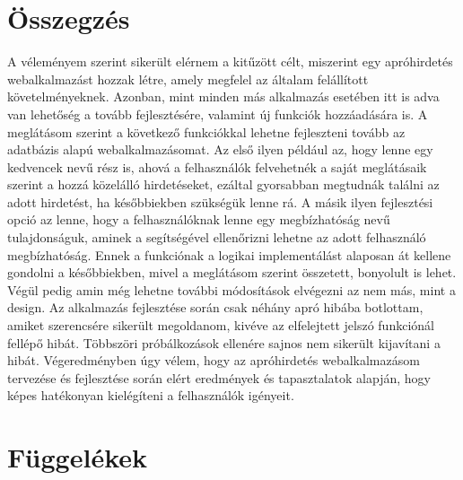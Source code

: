 \documentclass[]{thesis-ekf}
\theoremstyle{definition}
\theoremstyle{remark}
\begin{document}
	\chapter*{Összegzés}
		A véleményem szerint sikerült elérnem a kitűzött célt, miszerint egy apróhirdetés webalkalmazást hozzak létre, amely megfelel az általam felállított követelményeknek. Azonban, mint minden más alkalmazás esetében itt is adva van lehetőség a tovább fejlesztésére, valamint új funkciók hozzáadására is. A meglátásom szerint a következő funkciókkal lehetne fejleszteni tovább az adatbázis alapú webalkalmazásomat. Az első ilyen például az, hogy lenne egy kedvencek nevű rész is, ahová a felhasználók felvehetnék a saját meglátásaik szerint a hozzá közelálló hirdetéseket, ezáltal gyorsabban megtudnák találni az adott hirdetést, ha későbbiekben szükségük lenne rá. A másik ilyen fejlesztési opció az lenne, hogy a felhasználóknak lenne egy megbízhatóság nevű tulajdonságuk, aminek a segítségével ellenőrizni lehetne az adott felhasználó megbízhatóság. Ennek a funkciónak a logikai implementálást alaposan át kellene gondolni a későbbiekben, mivel a meglátásom szerint összetett, bonyolult is lehet. Végül pedig amin még lehetne további módosítások elvégezni az nem más, mint a design. Az alkalmazás fejlesztése során csak néhány apró hibába botlottam, amiket szerencsére sikerült megoldanom, kivéve az elfelejtett jelszó funkciónál fellépő hibát. Többszöri próbálkozások ellenére sajnos nem sikerült kijavítani a hibát. Végeredményben úgy vélem, hogy az apróhirdetés webalkalmazásom tervezése és fejlesztése során elért eredmények és tapasztalatok alapján, hogy képes hatékonyan kielégíteni a felhasználók igényeit.
		
	\chapter{Függelékek}\label{ch-fugg}
\end{document}
